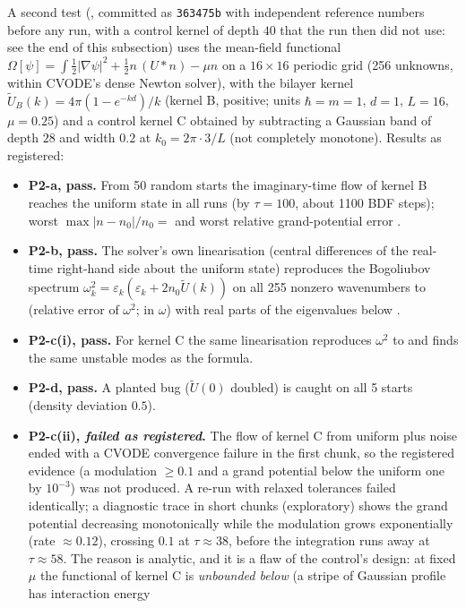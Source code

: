 \documentclass[11pt,a4paper]{article}
\begin{document}
A second test (, committed as \texttt{363475b} with independent reference numbers
before any run, with a control kernel of depth $40$ that the run then did not use: see the end of this subsection) uses the mean-field
functional $\Omega[\psi]=\int\tfrac12|\nabla\psi|^2+\tfrac12 n\,(U\!\ast n)-\mu n$ on a
$16\times16$ periodic grid (256 unknowns, within CVODE's dense Newton solver), with the bilayer kernel $\tilde U_B(k)=4\pi(1-e^{-kd})/k$
(kernel B, positive; units $\hbar=m=1$, $d=1$, $L=16$, $\mu=0.25$) and a control kernel C obtained by subtracting a Gaussian band of depth
$28$ and width $0.2$ at $k_0=2\pi\cdot3/L$ (not completely monotone). Results as registered:
\begin{itemize}[nosep]
\item \textbf{P2-a, pass.} From 50 random starts the imaginary-time flow of kernel B reaches the uniform state in all runs (by $\tau=100$,
about 1100 BDF steps); worst $\max|n-n_0|/n_0=$ \PtwoAdev{} and worst relative grand-potential error \PtwoAom{}.
\item \textbf{P2-b, pass.} The solver's own linearisation (central differences of the real-time right-hand side about the uniform state)
reproduces the Bogoliubov spectrum $\omega_k^2=\varepsilon_k(\varepsilon_k+2n_0\tilde U(k))$ on all 255 nonzero wavenumbers to
\PtwoBomTwo{} (relative error of $\omega^2$; \PtwoBom{} in $\omega$) with real parts of the eigenvalues below \PtwoBre.
\item \textbf{P2-c(i), pass.} For kernel C the same linearisation reproduces $\omega^2$ to \PtwoCom{} and finds the same \PtwoCn{} unstable modes as the formula.
\item \textbf{P2-d, pass.} A planted bug ($\tilde U(0)$ doubled) is caught on all 5 starts (density deviation $0.5$).
\item \textbf{P2-c(ii), \emph{failed as registered}.} The flow of kernel C from uniform plus noise ended with a CVODE convergence failure in
the first chunk, so the registered evidence (a modulation $\ge0.1$ and a grand potential below the uniform one by $10^{-3}$) was
not produced. A re-run with relaxed tolerances failed identically; a diagnostic trace in short chunks (exploratory) shows
the grand potential decreasing monotonically while the modulation grows exponentially (rate $\approx0.12$), crossing $0.1$ at
$\tau\approx38$, before the integration runs away at $\tau\approx58$. The reason is analytic, and it is a flaw of the control's design: at
fixed $\mu$ the functional of kernel C is \emph{unbounded below} (a stripe of Gaussian profile has interaction energy

\end{itemize}
\end{document}
